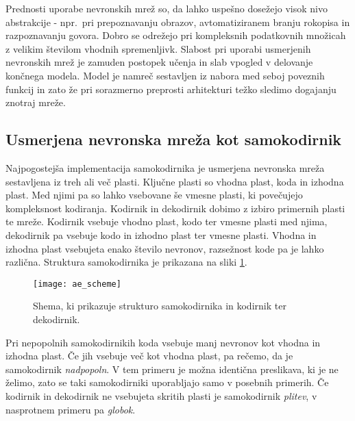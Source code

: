 \documentclass[12pt,a4paper,twoside]{article}
\theoremstyle{definition} %
\theoremstyle{plain} %
\numberwithin{equation}{section}  %
\begin{document}
Prednosti uporabe nevronskih mrež so, da lahko uspešno dosežejo visok nivo abstrakcije - 
npr.\ pri prepoznavanju obrazov, avtomatiziranem branju rokopisa in razpoznavanju govora. 
Dobro se odrežejo pri kompleksnih podatkovnih množicah z velikim številom vhodnih spremenljivk. 
Slabost pri uporabi usmerjenih nevronskih mrež je zamuden postopek učenja in slab vpogled v delovanje končnega modela.
Model je namreč sestavljen iz nabora med seboj poveznih funkcij in zato že pri sorazmerno preprosti arhitekturi težko sledimo dogajanju znotraj mreže.



\subsection{Usmerjena nevronska mreža kot samokodirnik}



Najpogostejša implementacija samokodirnika je usmerjena nevronska mreža sestavljena iz treh ali več plasti.
Ključne plasti so vhodna plast, koda in izhodna plast.
Med njimi pa so lahko vsebovane še vmesne plasti, ki povečujejo kompleksnost kodiranja. 
Kodirnik in dekodirnik dobimo z izbiro primernih plasti te mreže.
Kodirnik vsebuje vhodno plast, kodo ter vmesne plasti med njima, dekodirnik pa vsebuje kodo in izhodno plast ter vmesne plasti. 
Vhodna in izhodna plast vsebujeta enako število nevronov, razsežnost kode pa je lahko različna. 
Struktura samokodirnika je prikazana na sliki \ref{fig:samokodirnik}.

\begin{figure}[h!]
	\label{fig:samokodirnik}
	\centering
	\texttt{[image: ae\_scheme]}
	\caption[Shema samokodirnika]{Shema, ki prikazuje strukturo samokodirnika in kodirnik ter dekodirnik.}
\end{figure}

Pri nepopolnih samokodirnikih koda vsebuje manj nevronov kot vhodna in izhodna plast. 
Če jih vsebuje več kot vhodna plast, pa rečemo, da je samokodirnik \emph{nadpopoln}. 
V tem primeru je možna identična preslikava, ki je ne želimo, zato se taki samokodirniki uporabljajo samo v posebnih primerih. 
Če kodirnik in dekodirnik ne vsebujeta skritih plasti je samokodirnik \emph{plitev}, v nasprotnem primeru pa \emph{globok}.
\end{document}
